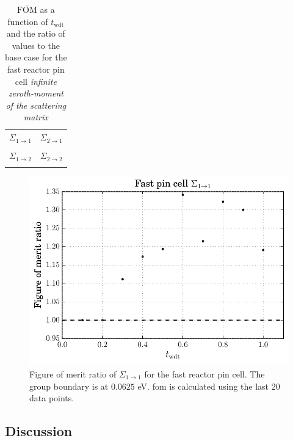 \begin{table}[hbtp]
  \centering
  \caption[$\overline{\mathrm{FOM}}$ and ratio for
  the fast reactor pin cell \textit{infinite zeroth-moment of the scattering matrix}.]{$\overline{\mathrm{FOM}}$ as a function of
    $t_{\mathrm{wdt}}$ and the ratio of values to the base case for
    the fast reactor pin cell \textit{infinite zeroth-moment of the scattering matrix}}
  \begin{tabular}{cc} $\Sigma_{1\to 1}$ & $\Sigma_{2 \to 1}$ \\
 & 
 \\
$\Sigma_{1\to 2}$ & $\Sigma_{2 \to 2}$ \\
 & 
 
  \end{tabular}
  \label{tab:fast_inf_sp0}
\end{table}
\begin{figure}[hbtp]
  \centering
  \includegraphics[scale=0.9]{images/results/fast_inf_sp0_grp_1}
  \caption[Figure of merit ratio $\Sigma_{1 \to 1}$ for the fast reactor pin cell]{Figure of
    merit ratio of $\Sigma_{1 \to 1}$ for
    the fast reactor pin cell. The group boundary is at $0.0625$ eV. \gls{fom} is calculated
    using the last 20 data points.}
  \label{fig:fast_inf_sp0}
\end{figure}

\newpage

\subsection{Discussion}
\label{sec:fast_discussion}

